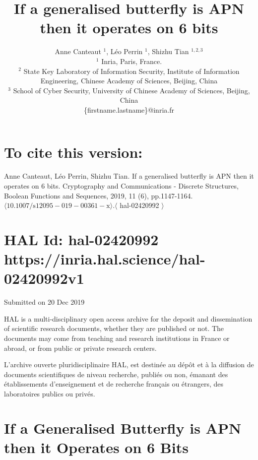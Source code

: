 \documentclass[10pt]{article}
\title{If a generalised butterfly is APN then it operates on 6 bits }
\author{Anne Canteaut ${ }^{1}$, Léo Perrin ${ }^{1}$, Shizhu Tian ${ }^{1,2,3}$\\
${ }^{1}$ Inria, Paris, France.\\
${ }^{2}$ State Key Laboratory of Information Security, Institute of Information Engineering, Chinese Academy of Sciences, Beijing, China\\
${ }^{3}$ School of Cyber Security, University of Chinese Academy of Sciences, Beijing, China\\
\{firstname.lastname\}@inria.fr}
\date{}
\begin{document}
\maketitle
\captionsetup{singlelinecheck=false}


\section*{To cite this version:}
Anne Canteaut, Léo Perrin, Shizhu Tian. If a generalised butterfly is APN then it operates on 6 bits. Cryptography and Communications - Discrete Structures, Boolean Functions and Sequences, 2019, 11 (6), pp.1147-1164. $\langle 10.1007 / \mathrm{s} 12095-019-00361-\mathrm{x}\rangle .\langle$ hal-02420992 $\rangle$

\section*{HAL Id: hal-02420992 \\
 https://inria.hal.science/hal-02420992v1}
Submitted on 20 Dec 2019

HAL is a multi-disciplinary open access archive for the deposit and dissemination of scientific research documents, whether they are published or not. The documents may come from teaching and research institutions in France or abroad, or from public or private research centers.

L'archive ouverte pluridisciplinaire HAL, est destinée au dépôt et à la diffusion de documents scientifiques de niveau recherche, publiés ou non, émanant des établissements d'enseignement et de recherche français ou étrangers, des laboratoires publics ou privés.

\section*{If a Generalised Butterfly is APN then it Operates on 6 Bits }
\end{document}
